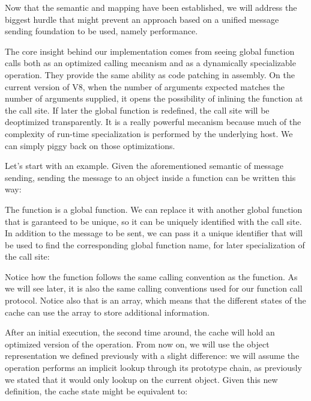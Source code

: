 Now that the semantic and mapping have been established, we will address the
biggest hurdle that might prevent an approach based on a unified message
sending foundation to be used, namely performance.

The core insight behind our implementation comes from seeing global function
calls both as an optimized calling mecanism and as a dynamically specializable
operation. They provide the same ability as code patching in assembly. On
the current version of V8, when the number of arguments expected matches the
number of arguments supplied, it opens the possibility of inlining the function
at the call site. If later the global function is redefined, the call site will
be deoptimized transparently. It is a really powerful mecanism because much of
the complexity of run-time specialization is performed by the underlying host.
We can simply piggy back on those optimizations.

Let's start with an example. Given the aforementioned semantic of message
sending, sending the message  to an object  inside a 
function can be written this way:


The  function is a global function. We can replace it with another
global function that is garanteed to be unique, so it can be uniquely
identified with the call site. In addition to the message to be sent, we can
pass it a unique identifier that will be used to find the corresponding global
function name, for later specialization of the call site:


Notice how the  function follows the same calling convention as
the  function. As we will see later, it is also the same calling
conventions used for our function call protocol. Notice also that
 is an array, which means that the different states of the cache
can use the array to store additional information.

After an initial execution, the second time around, the cache will hold an
optimized version of the operation. From now on, we will use the object
representation we defined previously with a slight difference: we will assume
the  operation performs an implicit lookup through its prototype chain,
as previously we stated that it would only lookup on the current object.
Given this new definition, the cache state might be equivalent to:

